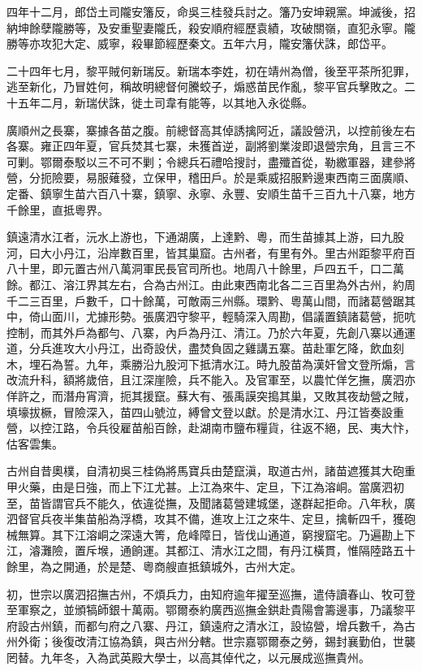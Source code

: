 \begin{pinyinscope}
四年十二月，郎岱土司隴安籓反，命吳三桂發兵討之。籓乃安坤親黨。坤滅後，招納坤餘孽隴勝等，及安重聖妻隴氏，殺安順府經歷袁績，攻破關嶺，直犯永寧。隴勝等亦攻犯大定、威寧，殺畢節經歷秦文。五年六月，隴安籓伏誅，郎岱平。

二十四年七月，黎平賊何新瑞反。新瑞本李姓，初在靖州為僧，後至平茶所犯罪，逃至新化，乃冒姓何，稱故明總督何騰蛟子，煽惑苗民作亂，黎平官兵擊敗之。二十五年二月，新瑞伏誅，徙土司韋有能等，以其地入永從縣。

廣順州之長寨，寨據各苗之腹。前總督高其倬誘擒阿近，議設營汛，以控前後左右各寨。雍正四年夏，官兵焚其七寨，未獲首逆，副將劉業浚即退營宗角，且言三不可剿。鄂爾泰駁以三不可不剿；令總兵石禮哈搜討，盡殲首從，勒繳軍器，建參將營，分扼險要，易服薙發，立保甲，稽田戶。於是乘威招服黔邊東西南三面廣順、定番、鎮寧生苗六百八十寨，鎮寧、永寧、永豐、安順生苗千三百九十八寨，地方千餘里，直抵粵界。

鎮遠清水江者，沅水上游也，下通湖廣，上達黔、粵，而生苗據其上游，曰九股河，曰大小丹江，沿岸數百里，皆其巢窟。古州者，有里有外。里古州距黎平府百八十里，即元置古州八萬洞軍民長官司所也。地周八十餘里，戶四五千，口二萬餘。都江、溶江界其左右，合為古州江。由此東西南北各二三百里為外古州，約周千二三百里，戶數千，口十餘萬，可敵兩三州縣。環黔、粵萬山間，而諸葛營踞其中，倚山面川，尤據形勢。張廣泗守黎平，輕騎深入周勘，倡議置鎮諸葛營，扼吭控制，而其外戶為都勻、八寨，內戶為丹江、清江。乃於六年夏，先創八寨以通運道，分兵進攻大小丹江，出奇設伏，盡焚負固之雞講五寨。苗赴軍乞降，飲血刻木，埋石為誓。九年，乘勝沿九股河下抵清水江。時九股苗為漢奸曾文登所煽，言改流升科，額將歲倍，且江深崖險，兵不能入。及官軍至，以農忙佯乞撫，廣泗亦佯許之，而潛舟宵濟，扼其援竄。蘇大有、張禹謨突搗其巢，又敗其夜劫營之賊，填壕拔橛，冒險深入，苗四山號泣，縛曾文登以獻。於是清水江、丹江皆奏設重營，以控江路，令兵役雇苗船百餘，赴湖南市鹽布糧貨，往返不絕，民、夷大忭，估客雲集。

古州自昔奧樸，自清初吳三桂偽將馬寶兵由楚竄滇，取道古州，諸苗遮獲其大砲重甲火藥，由是日強，而上下江尤甚。上江為來牛、定旦，下江為溶峒。當廣泗初至，苗皆謂官兵不能久，依違從撫，及聞諸葛營建城堡，遂群起拒命。八年秋，廣泗督官兵夜半集苗船為浮橋，攻其不備，進攻上江之來牛、定旦，擒斬四千，獲砲械無算。其下江溶峒之深遠大箐，危峰障日，皆伐山通道，窮搜窟宅。乃遍勘上下江，濬灘險，置斥堠，通餉運。其都江、清水江之間，有丹江橫貫，惟隔陸路五十餘里，為之開通，於是楚、粵商艘直抵鎮城外，古州大定。

初，世宗以廣泗招撫古州，不煩兵力，由知府逾年擢至巡撫，遣侍讀春山、牧可登至軍察之，並頒犒師銀十萬兩。鄂爾泰約廣西巡撫金鉷赴貴陽會籌邊事，乃議黎平府設古州鎮，而都勻府之八寨、丹江，鎮遠府之清水江，設協營，增兵數千，為古州外衛；後復改清江協為鎮，與古州分轄。世宗嘉鄂爾泰之勞，錫封襄勤伯，世襲罔替。九年冬，入為武英殿大學士，以高其倬代之，以元展成巡撫貴州。


\end{pinyinscope}
